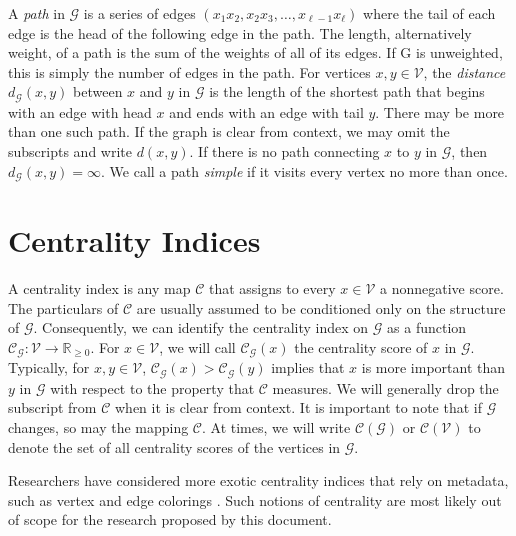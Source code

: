 \documentclass{report}
\begin{document}
A \emph{path} in $\mathcal{G}$ is a series of edges $(x_1 x_2, x_2 x_3, \dots, x_{\ell -1} x_\ell)$ where the tail of each edge is the head of the following edge in the path. 
The length, alternatively weight, of a path is the sum of the weights of all of its edges.
If G is unweighted, this is simply the number of edges in the path.
For vertices $x,y \in \mathcal{V}$, the \emph{distance} $d_\mathcal{G}(x,y)$ between $x$ and $y$ in $\mathcal{G}$ is the length of the shortest path that begins with an edge with head $x$ and ends with an edge with tail $y$. 
There may be more than one such path. 
If the graph is clear from context, we may omit the subscripts and write $d(x,y)$.
If there is no path connecting $x$ to $y$ in $\mathcal{G}$, then $d_\mathcal{G}(x,y) = \infty$. 
We call a path \emph{simple} if it visits every vertex no more than once. 


\section{Centrality Indices} \label{sec:centrality}

A centrality index is any map $\mathcal{C}$ that assigns to every $x \in \mathcal{V}$ a nonnegative score.
The particulars of $\mathcal{C}$ are usually assumed to be conditioned only on the structure of $\mathcal{G}$.
Consequently, we can identify the centrality index on $\mathcal{G}$ as a function $\mathcal{C}_\mathcal{G} : \mathcal{V} \rightarrow \mathbb{R}_{\geq 0}$.
For $x \in \mathcal{V}$, we will call $\mathcal{C}_\mathcal{G}(x)$ the centrality score of $x$ in $\mathcal{G}$. 
Typically, for $x,y \in \mathcal{V}$, $\mathcal{C}_\mathcal{G}(x) > \mathcal{C}_\mathcal{G}(y)$ implies that $x$ is more important than $y$ in $\mathcal{G}$ with respect to the property that $\mathcal{C}$ measures. 
We will generally drop the subscript from $\mathcal{C}$ when it is clear from context. 
It is important to note that if $\mathcal{G}$ changes, so may the mapping $\mathcal{C}$. 
At times, we will write $\mathcal{C}(\mathcal{G})$ or $\mathcal{C}(\mathcal{V})$ to denote the set of all centrality scores of the vertices in $\mathcal{G}$. 

Researchers have considered more exotic centrality indices that rely on metadata, such as vertex and edge colorings \cite{kang2016diffusion}.
Such notions of centrality are most likely out of scope for the research proposed by this document. 
\end{document}

